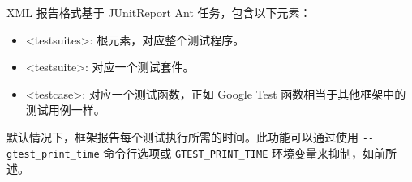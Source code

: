 XML 报告格式基于 JUnitReport Ant 任务，包含以下元素：

\begin{itemize}
\item
<testsuites>: 根元素，对应整个测试程序。

\item
<testsuite>: 对应一个测试套件。

\item
<testcase>: 对应一个测试函数，正如 Google Test 函数相当于其他框架中的测试用例一样。
\end{itemize}

默认情况下，框架报告每个测试执行所需的时间。此功能可以通过使用 \verb|--gtest_print_time| 命令行选项或 \verb|GTEST_PRINT_TIME| 环境变量来抑制，如前所述。



